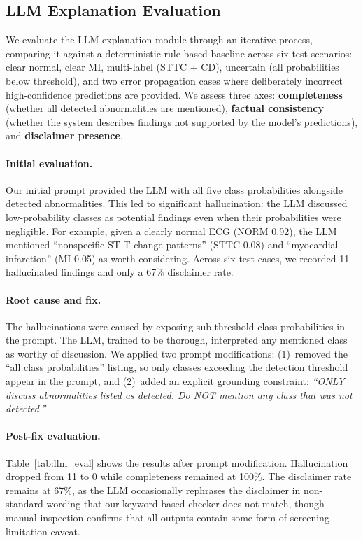 \documentclass[10pt]{article}
\begin{document}
\subsection{LLM Explanation Evaluation}

We evaluate the LLM explanation module through an iterative process, comparing it against a deterministic rule-based baseline across six test scenarios: clear normal, clear MI, multi-label (STTC + CD), uncertain (all probabilities below threshold), and two error propagation cases where deliberately incorrect high-confidence predictions are provided. We assess three axes: \textbf{completeness} (whether all detected abnormalities are mentioned), \textbf{factual consistency} (whether the system describes findings not supported by the model's predictions), and \textbf{disclaimer presence}.

\paragraph{Initial evaluation.} Our initial prompt provided the LLM with all five class probabilities alongside detected abnormalities. This led to significant hallucination: the LLM discussed low-probability classes as potential findings even when their probabilities were negligible. For example, given a clearly normal ECG (NORM 0.92), the LLM mentioned ``nonspecific ST-T change patterns'' (STTC 0.08) and ``myocardial infarction'' (MI 0.05) as worth considering. Across six test cases, we recorded 11 hallucinated findings and only a 67\% disclaimer rate.

\paragraph{Root cause and fix.} The hallucinations were caused by exposing sub-threshold class probabilities in the prompt. The LLM, trained to be thorough, interpreted any mentioned class as worthy of discussion. We applied two prompt modifications: (1)~removed the ``all class probabilities'' listing, so only classes exceeding the detection threshold appear in the prompt, and (2)~added an explicit grounding constraint: \textit{``ONLY discuss abnormalities listed as detected. Do NOT mention any class that was not detected.''}

\paragraph{Post-fix evaluation.} Table~\ref{tab:llm_eval} shows the results after prompt modification. Hallucination dropped from 11 to 0 while completeness remained at 100\%. The disclaimer rate remains at 67\%, as the LLM occasionally rephrases the disclaimer in non-standard wording that our keyword-based checker does not match, though manual inspection confirms that all outputs contain some form of screening-limitation caveat.
\end{document}
